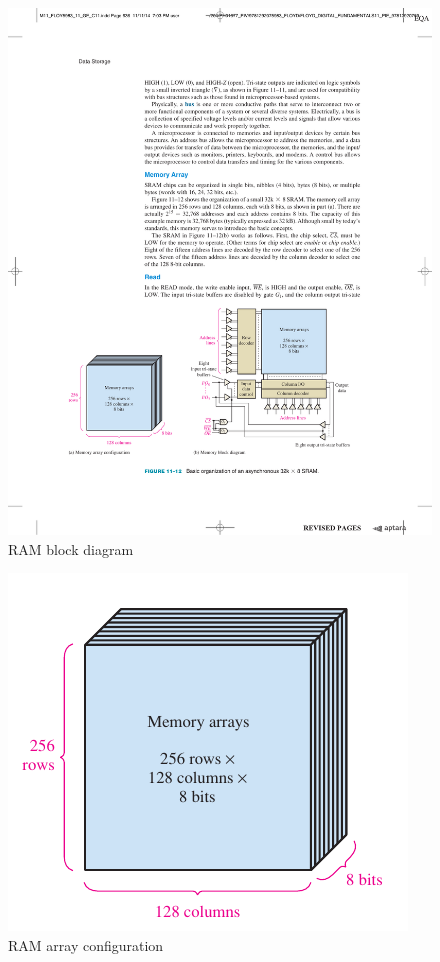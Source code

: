 \begin{figure}[H]
    \centering
    \includegraphics[scale = 0.85]{Graphics/VHDL/Practice 6/RAM/RAM_BLOCK_DIAG.pdf}
    \caption{RAM block diagram ~\autocite{FLOYD}}
    \label{fig:RAM_BLOCK_DIAG}
\end{figure}


\begin{figure}[H]
    \centering
    \includegraphics[scale = 0.85]{Graphics/VHDL/Practice 6/RAM/RAM_BLOCK_CONFIG.pdf}
    \caption{RAM array configuration ~\autocite{FLOYD}}
    \label{fig:RAM_BLOCK_CONFIG}
\end{figure}


